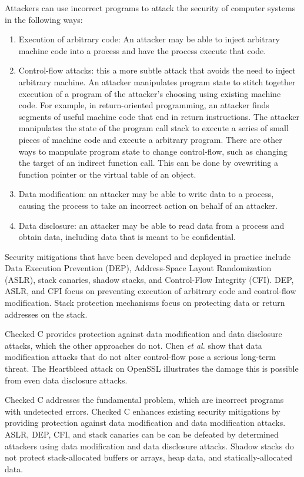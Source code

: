 Attackers can use incorrect programs to attack the security of 
computer systems in the following ways:
\begin{enumerate}
\item  Execution of arbitrary code: An attacker may be able to inject arbitrary machine code into a process and have the process  execute that code.
\item Control-flow attacks: this a more subtle attack that avoids the need to inject arbitrary machine.  An attacker manipulates program state to
stitch together execution of a program of the attacker's choosing
using existing machine code.
For example, in return-oriented programming, an attacker finds segments of useful
machine code that end in return instructions. The attacker manipulates the state of 
the program call  stack to execute a series of small pieces of machine code and execute
a arbitrary program.  There are other ways to manpulate program state to
change control-flow, such as changing the target of an indirect function call.  
This can be done by 
ovewriting a function pointer or the virtual table of an object.
\item Data modification: an attacker may be able to write data to a process, causing the process to take an incorrect action on behalf of an attacker.
\item  Data disclosure: an attacker may be able to read data from a process 
and obtain data, including data that is meant to be confidential.  
\end{enumerate}

Security mitigations that have been developed and deployed in
practice include Data Execution Prevention (DEP), 
Address-Space Layout Randomization (ASLR), stack canaries,
shadow stacks, and Control-Flow Integrity (CFI).   DEP, ASLR, and CFI focus
on preventing execution of arbitrary code and control-flow modification.  
Stack protection mechanisms focus on protecting data or return addresses
on the stack. 

Checked C provides protection against data modification and
data disclosure attacks, which the other approaches do not.
Chen {\it et al.} \cite{Chen2005} show that data modification
attacks that do not alter control-flow pose a serious long-term threat.
The Heartbleed attack on OpenSSL illustrates the damage this is
possible from even data disclosure attacks.

Checked C addresses the fundamental problem, which are incorrect programs
with undetected errors. Checked C enhances existing security mitigations by
providing protection against data modification and data modification attacks.
ASLR, DEP, CFI, and stack canaries can be 
can be defeated by determined attackers using data modification and data disclosure
attacks.  Shadow stacks do not protect stack-allocated buffers or arrays, 
heap data, and statically-allocated data.

